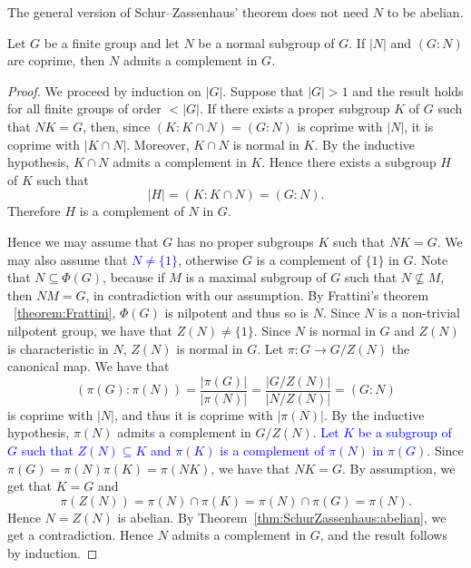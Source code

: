 The general version of 
Schur--Zassenhaus' theorem does not need $N$ to be abelian. 


\begin{theorem}
	\label{thm:SchurZassenhaus}
	Let $G$ be a finite group and let $N$ be a normal subgroup of $G$. If 
	$|N|$ and $(G:N)$ are coprime, then $N$ admits a complement in $G$. 
\end{theorem}

\begin{proof}
	We proceed by induction on $|G|$. Suppose that $|G|>1$ and the result holds for all finite groups of order $<|G|$.
	If there exists a proper subgroup $K$ of
	$G$ such that $NK=G$, then, since $(K:K\cap N)=(G:N)$ is coprime with $|N|$, it is coprime with  
	$|K\cap N|$. Moreover, $K\cap N$ is normal in $K$. By the inductive hypothesis, 
	$K\cap N$ admits a complement in $K$. Hence there exists a subgroup 
    $H$ of $K$ such that 
    \[
    |H|=(K:K\cap N)=(G:N).
    \] 
	Therefore $H$ is a complement of $N$ in $G$.
	
	Hence we may assume that $G$ has no proper subgroups $K$ such that  $NK=G$.  We may also assume that \textcolor{blue}{$N\ne\{1\}$}, otherwise $G$ is a complement of $\{ 1\}$ in $G$.
	Note that $N\subseteq \Phi(G)$, because if $M$ is a maximal subgroup of $G$ such that $N\not\subseteq M$, then $NM=G$, in contradiction with our assumption. By Frattini's theorem ~\ref{theorem:Frattini}, $\Phi(G)$ is nilpotent and thus so is $N$. Since $N$ is a non-trivial nilpotent group, we have that $Z(N)\ne\{1\}$. Since $N$ is normal in $G$ and $Z(N)$ is
	characteristic in $N$, $Z(N)$ is normal in $G$. Let $\pi\colon G\to
	G/Z(N)$ the canonical map.   We have that 
	\[
	(\pi(G):\pi(N))=\frac{|\pi(G)|}{|\pi(N)|}=\frac{|G/Z(N)|}{|N/Z(N)|}=(G:N)
	\]
	is coprime with $|N|$, and thus it is coprime with $|\pi(N)|$. 
	By the inductive hypothesis, $\pi(N)$ admits a complement in $G/Z(N)$. 
	\textcolor{blue}{Let $K$ be a subgroup of $G$ such that $Z(N)\subseteq K$ and $\pi(K)$ is a complement of $\pi(N)$ in $\pi(G)$.} Since 
	$\pi(G)=\pi(N)\pi(K)=\pi(NK)$, we have that $NK=G$. 
	By assumption, we get that $K=G$ and 
	\[
		\pi(Z(N))=\pi(N)\cap\pi(K)=\pi(N)\cap\pi(G)=\pi(N).
	\]
	Hence $N=Z(N)$ is abelian. By 
	Theorem~\ref{thm:SchurZassenhaus:abelian}, we get a contradiction. Hence $N$ admits a complement in $G$, and the result follows by induction.
\end{proof}

